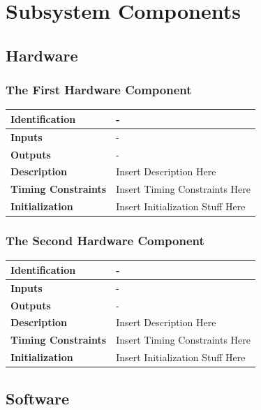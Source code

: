 \documentclass [11pt]{article}
\begin{document}


\section{Subsystem Components}

\subsection{Hardware}

\subsubsection{The First Hardware Component}
\begin{longtable}{| p{ } | p{ } | }\hline 
\textbf{Identification} & - \\ \hline
\textbf{Inputs} & - \\ \hline
\textbf{Outputs} & - \\ \hline
\textbf{Description} & Insert Description Here\\ \hline 
\textbf{Timing Constraints} & Insert Timing Constraints Here\\ \hline 
\textbf{Initialization} & Insert Initialization Stuff Here\\ \hline 
\end{longtable}

\subsubsection{The Second Hardware Component}
\begin{longtable}{| p{ } | p{ } | }\hline 
\textbf{Identification} & - \\ \hline
\textbf{Inputs} & - \\ \hline
\textbf{Outputs} & - \\ \hline
\textbf{Description} & Insert Description Here\\ \hline 
\textbf{Timing Constraints} & Insert Timing Constraints Here\\ \hline 
\textbf{Initialization} & Insert Initialization Stuff Here\\ \hline 
\end{longtable}

\subsection{Software}
\end{document}
